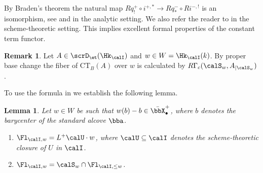 \documentclass[10pt, reqno]{amsart}
\theoremstyle{plain}
\newtheorem{lemma}[theorem]{Lemma}
\theoremstyle{definition}
\newtheorem{remark}[theorem]{Remark}
\numberwithin{equation}{section}
\begin{document}
	By Braden's theorem the natural map
	$Rq^+_!\circ i^{+,\ast}\to Rq^-_\ast\circ Ri^{-,!}$
	is an isomorphism, see \cite[Theorem IV.6.5]{FS21} and \cite[Section 6]{AGLR22} in the analytic setting. We also refer the reader to \cite[Theorem B]{Ric19a} in the scheme-theoretic setting.  This implies excellent formal properties of the constant term functor.
	
	\begin{remark}
		\label{sec:constant-terms-semi-fibers-of-constant-terms}
		Let $A\in \scrD_\et(\Hk_{\calI})$ and $w\in W=\Hk_{\calI}(k)$. By proper base change the fiber of $\mathrm{CT}_B(A)$ over $w$ is calculated by $R\Gamma_c(\calS_w, A_{|\calS_w})$.
	\end{remark}
	
	To use the formula in  we establish the following lemma.
	
	\begin{lemma}\label{lem_schubert_cell_in_semi_infinite_orbit}
		Let $w\in W$ be such that $w(b)-b \in \bar{\bbX}_\bullet^+$, where $b$ denotes the barycenter of the standard alcove $\bba$.
		\begin{enumerate}
			\item $\Fl_{\calI,w}=L^+\calU\cdot w$, where $\calU\subseteq \calI$ denotes the scheme-theoretic closure of $U$ in $\calI$. 
			\item $\Fl_{\calI,w}=\calS_{w}\cap \Fl_{\calI, \leq w}$.
		\end{enumerate}
		
	\end{lemma}
	
\end{document}
